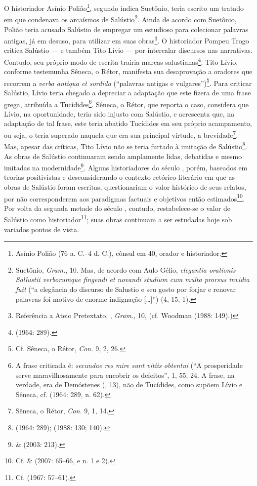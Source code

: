 O historiador Asínio Polião\footnote{Asínio Polião (76 a. C.--4 d. C.), cônsul
em 40, orador e historiador.}, segundo indica Suetônio, teria escrito um
tratado em que condenava os arcaísmos de Salústio\footnote{Suetônio, \emph{Gram.}, 10. Mas, de acordo com Aulo Gélio,  \emph{elegantia orationis
Sallustii verborumque fingendi et novandi studium cum multa prorsus invidia
fuit} (“a elegância do discurso de Salustio e seu gosto por forjar e renovar
palavras foi motivo de enorme indignação [\ldots{}]”) (4, 15,
1).}. Ainda de acordo com Suetônio, Polião teria acusado Salústio de empregar
um estudioso para colecionar palavras antigas, já em desuso, para utilizar em
suas obras\footnote{ Referência a Ateio Pretextato, , \emph{Gram.}, 10, (cf. Woodman (1988: 149).)}.  O historiador Pompeu Trogo critica Salústio ---
e também Tito Lívio --- por intercalar discursos nas narrativas. Contudo, seu
próprio modo de escrita trairia marcas salustianas\footnote{ (1964: 289).}. Tito Lívio, conforme testemunha Sêneca, o Rétor, manifesta sua
desaprovação a oradores que recorrem a \emph{verba antiqua et sordida}
(``palavras antigas e vulgares'')\footnote{ Cf. Sêneca, o Rétor, \emph{Con.}
9, 2, 26.}. Para criticar Salústio, Lívio teria chegado a depreciar a adaptação
que este fizera de uma frase grega, atribuída a Tucídides\footnote{A frase
criticada é: \emph{secundae res mire sunt vitiis obtentui} (“A prosperidade
serve maravilhosamente para encobrir os defeitos”, 1, 55, 24.
A frase, na verdade, era de Demóstenes  (, 13), não de Tucídides, como supõem
Lívio e Sêneca, cf.  (1964: 289, n. 62).}.  Sêneca, o Rétor, que reporta
o caso, considera que Lívio, na oportunidade, teria sido injusto com Salústio,
e acrescenta que, na adaptação de tal frase, este teria abatido Tucídides em
seu próprio acampamento, ou seja, o teria superado naquela que era sua
principal virtude, a brevidade\footnote{Sêneca, o Rétor,  \emph{Con.} 9, 1,
14.}. Mas, apesar das críticas, Tito Lívio não se teria furtado à imitação de
Salústio\footnote{ (1964: 289);  (1988: 130; 140).}.  As
obras de Salústio continuaram sendo amplamente lidas, debatidas e mesmo
imitadas na modernidade\footnote{  \&  (2003: 213).}. Alguns
historiadores do século , porém, baseados em teorias positivistas e
desconsiderando o contexto retórico-literário em que as obras de Salústio foram
escritas, questionariam o valor histórico de seus relatos, por não
corresponderem aos paradigmas factuais e objetivos então estimados\footnote{Cf.  \&  (2007: 65--66, e n. 1 e 2).}.  Por volta da segunda
  metade do século , contudo, restabelece-se o valor de Salústio
  como historiador\footnote{Cf.  (1967: 57--61).}; suas obras
  continuam a ser estudadas hoje sob variados pontos de vista.


